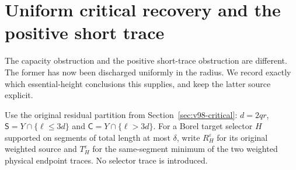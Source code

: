 \section{Uniform critical recovery and the positive short trace}
\label{sec:v100-recovery}
The capacity obstruction and the positive short-trace obstruction
are different. The former has now been discharged uniformly in the
radius. We record exactly which essential-height conclusions this
supplies, and keep the latter source explicit.

Use the original residual partition from Section~\ref{sec:v98-critical}:
$d=2qr$, $\mathsf S=Y\cap\{\ell\le3d\}$ and
$\mathsf C=Y\cap\{\ell>3d\}$. For a Borel target selector $H$
supported on segments of total length at most $\delta$, write
$R_H^\varepsilon$ for its original weighted source and
$T_H^\varepsilon$ for the same-segment minimum of the two weighted
physical endpoint traces. No selector trace is introduced.

